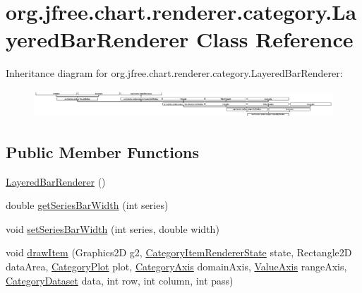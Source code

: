 \hypertarget{classorg_1_1jfree_1_1chart_1_1renderer_1_1category_1_1_layered_bar_renderer}{}\section{org.\+jfree.\+chart.\+renderer.\+category.\+Layered\+Bar\+Renderer Class Reference}
\label{classorg_1_1jfree_1_1chart_1_1renderer_1_1category_1_1_layered_bar_renderer}
Inheritance diagram for org.\+jfree.\+chart.\+renderer.\+category.\+Layered\+Bar\+Renderer\+:\begin{figure}[H]
\begin{center}
\leavevmode
\includegraphics[height=1.030928cm]{classorg_1_1jfree_1_1chart_1_1renderer_1_1category_1_1_layered_bar_renderer}
\end{center}
\end{figure}
\subsection*{Public Member Functions}
\begin{DoxyCompactItemize}
\item 
\mbox{\hyperlink{classorg_1_1jfree_1_1chart_1_1renderer_1_1category_1_1_layered_bar_renderer_aa2fd334eb38a2fb87b439e13b22c1d77}{Layered\+Bar\+Renderer}} ()
\item 
double \mbox{\hyperlink{classorg_1_1jfree_1_1chart_1_1renderer_1_1category_1_1_layered_bar_renderer_a9c8a45dad7261f7321226690575a2cd3}{get\+Series\+Bar\+Width}} (int series)
\item 
void \mbox{\hyperlink{classorg_1_1jfree_1_1chart_1_1renderer_1_1category_1_1_layered_bar_renderer_aa4de8ddfd0f4b9ed8095b1a49967e410}{set\+Series\+Bar\+Width}} (int series, double width)
\item 
void \mbox{\hyperlink{classorg_1_1jfree_1_1chart_1_1renderer_1_1category_1_1_layered_bar_renderer_a741c190071d446f3fb5f81e0b6091f4b}{draw\+Item}} (Graphics2D g2, \mbox{\hyperlink{classorg_1_1jfree_1_1chart_1_1renderer_1_1category_1_1_category_item_renderer_state}{Category\+Item\+Renderer\+State}} state, Rectangle2D data\+Area, \mbox{\hyperlink{classorg_1_1jfree_1_1chart_1_1plot_1_1_category_plot}{Category\+Plot}} plot, \mbox{\hyperlink{classorg_1_1jfree_1_1chart_1_1axis_1_1_category_axis}{Category\+Axis}} domain\+Axis, \mbox{\hyperlink{classorg_1_1jfree_1_1chart_1_1axis_1_1_value_axis}{Value\+Axis}} range\+Axis, \mbox{\hyperlink{interfaceorg_1_1jfree_1_1data_1_1category_1_1_category_dataset}{Category\+Dataset}} data, int row, int column, int pass)
\end{DoxyCompactItemize}
